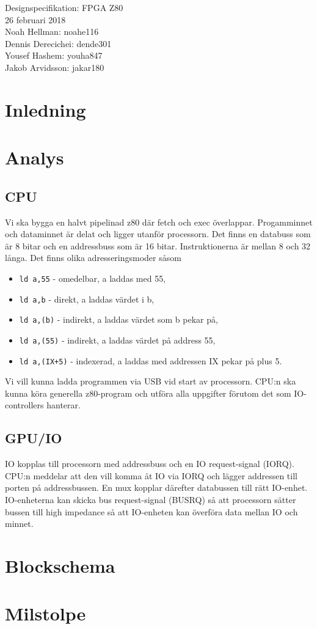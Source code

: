 \documentclass[12pt]{article}
\begin{document}
\begin{center}
\vspace*{2cm}
{\Huge Designspecifikation: FPGA Z80}\\
\vspace{2cm}
{\large 26 februari 2018}\\
\vspace{2cm}
Noah Hellman: noahe116 \\
Dennis Derecichei: dende301 \\
Yousef Hashem: youha847 \\
Jakob Arvidsson: jakar180 \\
\end{center}

\vspace{2cm}
\tableofcontents
\newpage

\section{Inledning}
\section{Analys}
\subsection{CPU}
Vi ska bygga en halvt pipelinad z80 där fetch och exec överlappar. Progamminnet
och dataminnet är delat och ligger utanför processorn. Det finns en databuss
som är 8 bitar och en addressbuss som är 16 bitar. Instruktionerna är mellan 8
och 32 långa. Det finns olika adresseringsmoder såsom
\begin{itemize}
    \item \texttt{ld a,55} - omedelbar, a laddas med 55,
    \item \texttt{ld a,b} - direkt, a laddas värdet i b,
    \item \texttt{ld a,(b)} - indirekt, a laddas värdet som b pekar på,
    \item \texttt{ld a,(55)} - indirekt, a laddas värdet på address 55,
    \item \texttt{ld a,(IX+5)} - indexerad, a laddas med addressen IX pekar på
        plus 5.
\end{itemize}
Vi vill kunna ladda programmen via USB vid start av processorn. CPU:n ska kunna
köra generella z80-program och utföra alla uppgifter förutom det som
IO-controllers hanterar.

\subsection{GPU/IO}
IO kopplas till processorn med addressbuss och en IO request-signal (IORQ).
CPU:n meddelar att den vill komma åt IO via IORQ och lägger addressen till
porten på addressbussen. En mux kopplar därefter databussen till rätt IO-enhet.
IO-enheterna kan skicka bus request-signal (BUSRQ) så att processorn sätter
bussen till high impedance så att IO-enheten kan överföra data mellan IO och
minnet.

\section{Blockschema}
\section{Milstolpe}
\end{document}
